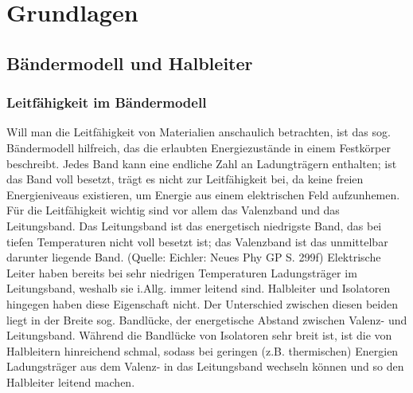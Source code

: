 
\section{Grundlagen}
\subsection{Bändermodell und Halbleiter}
\subsubsection{Leitfähigkeit im Bändermodell}
Will man die Leitfähigkeit von Materialien anschaulich betrachten, ist das sog. Bändermodell hilfreich, das die erlaubten Energiezustände in einem Festkörper beschreibt. Jedes Band kann eine endliche Zahl an Ladungträgern enthalten; ist das Band voll besetzt, trägt es nicht zur Leitfähigkeit bei, da keine freien Energieniveaus existieren, um Energie aus einem elektrischen Feld aufzunhemen. Für die Leitfähigkeit wichtig sind vor allem das Valenzband und das Leitungsband. Das Leitungsband ist das energetisch niedrigste Band, das bei tiefen Temperaturen nicht voll besetzt ist; das Valenzband ist das unmittelbar darunter liegende Band. (Quelle: Eichler: Neues Phy GP S. 299f)
Elektrische Leiter haben bereits bei sehr niedrigen Temperaturen Ladungsträger im Leitungsband, weshalb sie i.Allg. immer leitend sind. Halbleiter und Isolatoren hingegen haben diese Eigenschaft nicht. Der Unterschied zwischen diesen beiden liegt in der Breite sog. Bandlücke, der energetische Abstand zwischen Valenz- und Leitungsband. Während die Bandlücke von Isolatoren sehr breit ist, ist die von Halbleitern hinreichend schmal, sodass bei geringen (z.B. thermischen) Energien Ladungsträger aus dem Valenz- in das Leitungsband wechseln können und so den Halbleiter leitend machen.


